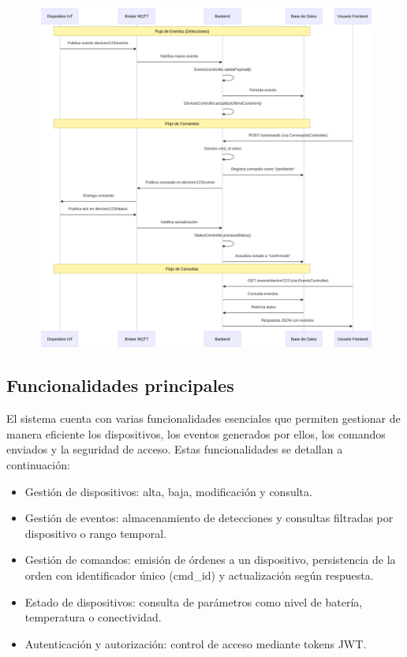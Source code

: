 \begin{figure}[htbp]
 
  \centering
  \includegraphics[width=1\linewidth]{./Figures/diagFlujoConexionBackend.png}
  \label{fig:diagrama_backend}
  \end{figure}

\FloatBarrier
\subsection{Funcionalidades principales}
El sistema cuenta con varias funcionalidades esenciales que permiten gestionar de manera eficiente los dispositivos, los eventos generados por ellos, los comandos enviados y la seguridad de acceso. Estas funcionalidades se detallan a continuación:

\begin{itemize}
    \item Gestión de dispositivos: alta, baja, modificación y consulta.
    \item Gestión de eventos: almacenamiento de detecciones y consultas filtradas por dispositivo o rango temporal.
    \item Gestión de comandos: emisión de órdenes a un dispositivo, persistencia de la orden con identificador único (cmd\_id) y actualización según respuesta.
    \item Estado de dispositivos: consulta de parámetros como nivel de batería, temperatura o conectividad.
    \item Autenticación y autorización: control de acceso mediante tokens JWT.
\end{itemize}


